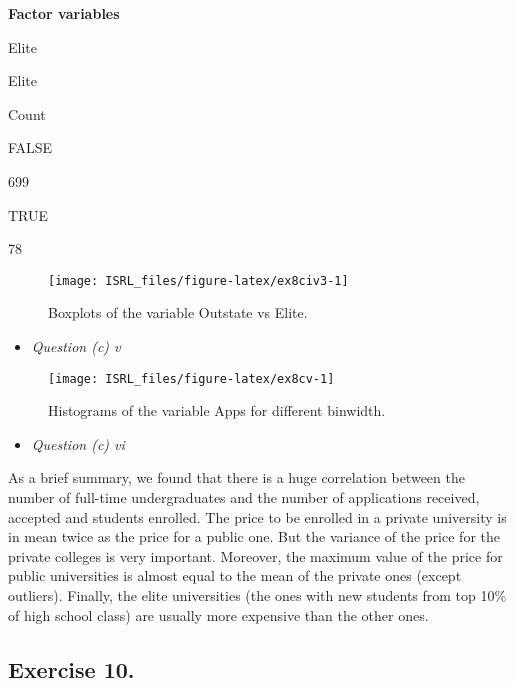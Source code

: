 \documentclass[]{book}
\providecommand{\tightlist}{%
  \setlength{\itemsep}{0pt}\setlength{\parskip}{0pt}}
\begin{document}
\textbf{Factor variables}

Elite

Elite

Count

FALSE

699

TRUE

78

\begin{figure}

{\centering \texttt{[image: ISRL\_files/figure-latex/ex8civ3-1]} 

}

\caption{Boxplots of the variable Outstate vs Elite.}\label{fig:ex8civ3}
\end{figure}

\begin{itemize}
\tightlist
\item
  \emph{Question (c) v}
\end{itemize}

\begin{figure}

{\centering \texttt{[image: ISRL\_files/figure-latex/ex8cv-1]} 

}

\caption{Histograms of the variable Apps for different binwidth.}\label{fig:ex8cv}
\end{figure}

\begin{itemize}
\tightlist
\item
  \emph{Question (c) vi}
\end{itemize}

As a brief summary, we found that there is a huge correlation between the number of full-time undergraduates and the number of applications received, accepted and students enrolled. The price to be enrolled in a private university is in mean twice as the price for a public one. But the variance of the price for the private colleges is very important. Moreover, the maximum value of the price for public universities is almost equal to the mean of the private ones (except outliers). Finally, the elite universities (the ones with new students from top 10\% of high school class) are usually more expensive than the other ones.

\hypertarget{exercise-10.}{%
\subsection{Exercise 10.}\label{exercise-10.}}
\end{document}
